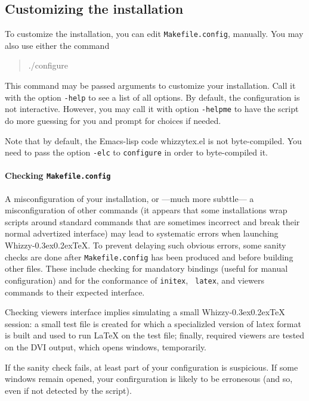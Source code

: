 \documentclass[12pt]{article}
\makeatletter
\let \lst \verb
\def \whizzy {{Whizzy\kern -0.3ex\raise 0.2ex\hbox{\let \@\relax\TeX}}}
\makeatother
\begin{document}
\subsection {Customizing the installation}

To customize the installation, you can edit 
\lst"Makefile.config", manually.
You may also use either the command
\begin{quote}
\begin{tt}
./configure
\end{tt}
\end{quote}
This command may be passed arguments to customize your installation.
Call it with the option \lst"-help" to see a list of all options.
%
By default, the configuration is not interactive.  However, you may call it
with option \lst"-helpme" to have the script do more guessing for you and
prompt for choices if needed.

Note that by default, the Emacs-lisp code whizzytex.el is not
byte-compiled. You need to pass the option \lst"-elc" to \lst"configure" in
order to byte-compiled it.

\paragraph {Checking {\tt Makefile.config}}

A misconfiguration of your installation, or ---much more subttle--- a
misconfiguration of other commands (it appears that some installations wrap
scripts around standard commands that are sometimes incorrect and break
their normal advertized interface) may lead to systematic errors when
launching {\whizzy}. To prevent delaying such obvious errors, some sanity
checks are done after \lst"Makefile.config" has been produced and before
building other files.  These include checking for mandatory bindings (useful
for manual configuration) and for the conformance of {\tt initex}, {\tt
latex}, and viewers commands to their expected interface.

Checking viewers interface implies simulating a small {\whizzy} session: a
small test file is created for which a specializled version of latex format
is built and used to run {\LaTeX} on the test file; finally, required
viewers are tested on the DVI output, which opens windows, temporarily.

If the sanity check fails, at least part of your configuration is 
suspicious. If some windows remain opened, your confirguration is likely to
be erronesous (and so, even if not detected by the script).  
\end{document}
